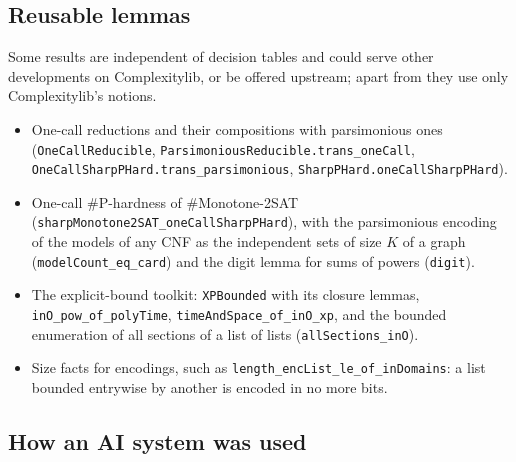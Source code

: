 \documentclass[pdflatex,sn-mathphys-num]{sn-jnl}
\theoremstyle{thmstyleone}
\theoremstyle{thmstylethree}
\begin{document}
\subsection{Reusable lemmas}
\label{sec:reusable}

Some results are independent of decision tables and could serve other developments on
Complexitylib, or be offered upstream; apart from  they use only
Complexitylib's notions.
\begin{itemize}
\item One-call reductions and their compositions with parsimonious ones
  (\lstinline{OneCallReducible}, \lstinline{ParsimoniousReducible.trans_oneCall},
  \lstinline{OneCallSharpPHard.trans_parsimonious}, \lstinline{SharpPHard.oneCallSharpPHard}).
\item One-call \#P-hardness of \#Monotone-2SAT (\lstinline{sharpMonotone2SAT_oneCallSharpPHard}),
  with the parsimonious encoding of the models of any CNF as the independent sets of size $K$ of
  a graph (\lstinline{modelCount_eq_card}) and the digit lemma for sums of powers
  (\lstinline{digit}).
\item The explicit-bound toolkit: \lstinline{XPBounded} with its closure lemmas,
  \lstinline{inO_pow_of_polyTime}, \lstinline{timeAndSpace_of_inO_xp}, and the bounded
  enumeration of all sections of a list of lists (\lstinline{allSections_inO}).
\item Size facts for encodings, such as \lstinline{length_encList_le_of_inDomains}: a list
  bounded entrywise by another is encoded in no more bits.
\end{itemize}

\subsection{How an AI system was used}
\label{sec:ai}
\end{document}
